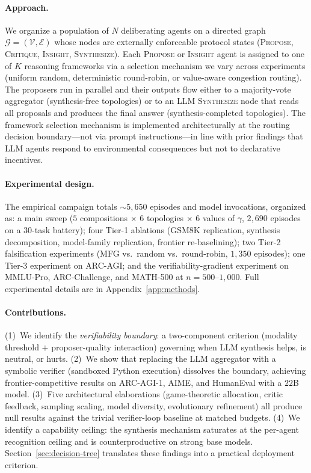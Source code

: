 \documentclass[11pt]{amsart}
\newcommand{\g}{\gamma}
\newcommand\1{{\mathds{1}}}
\newcommand\V{{\mathcal{V}}}
\newcommand\G{{\mathcal{G}}}
\theoremstyle{definition}
\theoremstyle{remark}
\numberwithin{equation}{section}
\begin{document}
\paragraph{Approach.}
We organize a population of $N$ deliberating agents on a directed graph $\G = (\V, \mathcal{E})$ whose nodes are externally enforceable protocol states (\textsc{Propose}, \textsc{Critique}, \textsc{Insight}, \textsc{Synthesize}).
Each \textsc{Propose} or \textsc{Insight} agent is assigned to one of $K$ reasoning frameworks via a selection mechanism we vary across experiments (uniform random, deterministic round-robin, or value-aware congestion routing).
The proposers run in parallel and their outputs flow either to a majority-vote aggregator (synthesis-free topologies) or to an LLM \textsc{Synthesize} node that reads all proposals and produces the final answer (synthesis-completed topologies).
The framework selection mechanism is implemented architecturally at the routing decision boundary---not via prompt instructions---in line with prior findings that LLM agents respond to environmental consequences but not to declarative incentives.

\paragraph{Experimental design.}
The empirical campaign totals $\sim\!5{,}650$ episodes and model invocations, organized as: a main sweep ($5$ compositions $\times$ $6$ topologies $\times$ $6$ values of $\g$, $2{,}690$ episodes on a $30$-task battery); four Tier-1 ablations (GSM8K replication, synthesis decomposition, model-family replication, frontier re-baselining); two Tier-2 falsification experiments (MFG vs.\ random vs.\ round-robin, $1{,}350$ episodes); one Tier-3 experiment on ARC-AGI; and the verifiability-gradient experiment on MMLU-Pro, ARC-Challenge, and MATH-500 at $n\!=\!500$--$1{,}000$.
Full experimental details are in Appendix~\ref{app:methods}.

\paragraph{Contributions.}
(1)~We identify the \emph{verifiability boundary}: a two-component criterion (modality threshold $+$ proposer-quality interaction) governing when LLM synthesis helps, is neutral, or hurts.
(2)~We show that replacing the LLM aggregator with a symbolic verifier (sandboxed Python execution) dissolves the boundary, achieving frontier-competitive results on ARC-AGI-1, AIME, and HumanEval with a $22$B model.
(3)~Five architectural elaborations (game-theoretic allocation, critic feedback, sampling scaling, model diversity, evolutionary refinement) all produce null results against the trivial verifier-loop baseline at matched budgets.
(4)~We identify a capability ceiling: the synthesis mechanism saturates at the per-agent recognition ceiling and is counterproductive on strong base models.
Section~\ref{sec:decision-tree} translates these findings into a practical deployment criterion.
\end{document}
